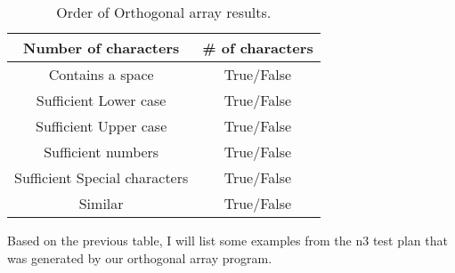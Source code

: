 \documentclass[12pt,letterpaper]{article}
\begin{document}
\begin{table}[h!]
  \begin{center}
    \caption{Order of Orthogonal array results.}
    \label{tab:Array setup}
    
    \begin{tabular}{||c|c||}
    \hline
	Number of characters & \# of characters \\
	\hline
	Contains a space & True/False \\
	\hline
	Sufficient Lower case & True/False \\
	\hline
	Sufficient Upper case& True/False \\
	\hline
	Sufficient numbers & True/False \\
	\hline
	Sufficient Special characters & True/False \\
	Similar & True/False \\
    \hline
    \end{tabular}
  \end{center}
\end{table}

Based on the previous table, I will list some examples from the n3 test plan that was generated by our orthogonal
array program. 
\end{document}
